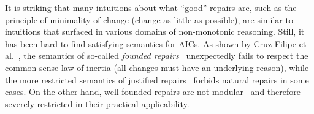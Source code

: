 \documentclass[runningheads]{llncs}
\begin{document}

It is striking that many intuitions about what ``good'' repairs are, such as the principle of minimality of change (change as little as possible), are similar to intuitions that surfaced in various domains of non-monotonic reasoning. %
Still, it has been hard to find satisfying semantics for AICs.
As shown by Cruz-Filipe et al.\ \cite{tase/Cruz-FilipeGEN13}, the semantics of so-called \emph{founded repairs}~\cite{iclp/CaropreseGSZ06} unexpectedly fails to respect the common-sense law of inertia (all changes must have an underlying reason), while the more restricted semantics of justified repairs~\cite{tplp/CaropreseT11} forbids natural repairs in some cases. On the other hand, well-founded repairs are not modular~\cite{foiks/Cruz-Filipe14} and therefore severely restricted in their practical applicability.

\end{document}
